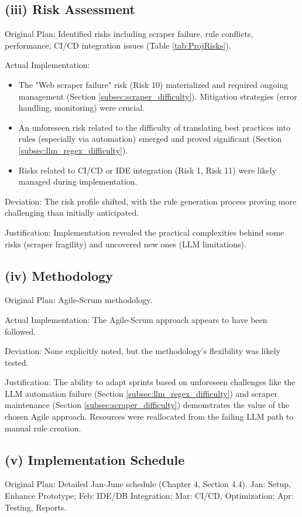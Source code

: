 \subsection{(iii) Risk Assessment}
Original Plan: Identified risks including scraper failure, rule conflicts, performance, CI/CD integration issues (Table \ref{tab:ProjRisks}).

Actual Implementation:
\begin{itemize}
    \item The "Web scraper failure" risk (Risk 10) materialized and required ongoing management (Section \ref{subsec:scraper_difficulty}). Mitigation strategies (error handling, monitoring) were crucial.
    \item An unforeseen risk related to the difficulty of translating best practices into rules (especially via automation) emerged and proved significant (Section \ref{subsec:llm_regex_difficulty}).
    \item Risks related to CI/CD or IDE integration (Risk 1, Risk 11) were likely managed during implementation.
\end{itemize}
Deviation: The risk profile shifted, with the rule generation process proving more challenging than initially anticipated.

Justification: Implementation revealed the practical complexities behind some risks (scraper fragility) and uncovered new ones (LLM limitations).

\subsection{(iv) Methodology}
Original Plan: Agile-Scrum methodology.

Actual Implementation: The Agile-Scrum approach appears to have been followed.

Deviation: None explicitly noted, but the methodology's flexibility was likely tested.

Justification: The ability to adapt sprints based on unforeseen challenges like the LLM automation failure (Section \ref{subsec:llm_regex_difficulty}) and scraper maintenance (Section \ref{subsec:scraper_difficulty}) demonstrates the value of the chosen Agile approach. Resources were reallocated from the failing LLM path to manual rule creation.

\subsection{(v) Implementation Schedule}
Original Plan: Detailed Jan-June schedule (Chapter 4, Section 4.4). Jan: Setup, Enhance Prototype; Feb: IDE/DB Integration; Mar: CI/CD, Optimization; Apr: Testing, Reports.

